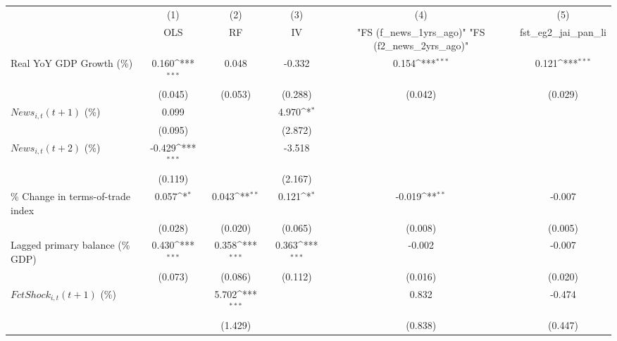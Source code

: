 {
\def\sym#1{\ifmmode^{#1}\else\(^{#1}\)\fi}
\begin{tabular}{l*{5}{c}}
\toprule
                    &\multicolumn{1}{c}{(1)}&\multicolumn{1}{c}{(2)}&\multicolumn{1}{c}{(3)}&\multicolumn{1}{c}{(4)}&\multicolumn{1}{c}{(5)}\\
                    &\multicolumn{1}{c}{OLS}&\multicolumn{1}{c}{RF}&\multicolumn{1}{c}{IV}&\multicolumn{1}{c}{ "FS (f_news_1yrs_ago)"  "FS (f2_news_2yrs_ago)" }&\multicolumn{1}{c}{fst_eg2_jai_pan_li}\\
\midrule
Real YoY GDP Growth (\%)&       0.160\sym{***}&       0.048         &      -0.332         &       0.154\sym{***}&       0.121\sym{***}\\
                    &     (0.045)         &     (0.053)         &     (0.288)         &     (0.042)         &     (0.029)         \\
\addlinespace
$ News_{i,t}(t+1)$ (\%)&       0.099         &                     &       4.970\sym{*}  &                     &                     \\
                    &     (0.095)         &                     &     (2.872)         &                     &                     \\
\addlinespace
$ News_{i,t}(t+2)$ (\%)&      -0.429\sym{***}&                     &      -3.518         &                     &                     \\
                    &     (0.119)         &                     &     (2.167)         &                     &                     \\
\addlinespace
\% Change in terms-of-trade index&       0.057\sym{*}  &       0.043\sym{**} &       0.121\sym{*}  &      -0.019\sym{**} &      -0.007         \\
                    &     (0.028)         &     (0.020)         &     (0.065)         &     (0.008)         &     (0.005)         \\
\addlinespace
Lagged primary balance (\% GDP)&       0.430\sym{***}&       0.358\sym{***}&       0.363\sym{***}&      -0.002         &      -0.007         \\
                    &     (0.073)         &     (0.086)         &     (0.112)         &     (0.016)         &     (0.020)         \\
\addlinespace
$ FctShock_{i,t}(t+1)$ (\%)&                     &       5.702\sym{***}&                     &       0.832         &      -0.474         \\
                    &                     &     (1.429)         &                     &     (0.838)         &     (0.447)         \\

\end{tabular}}
